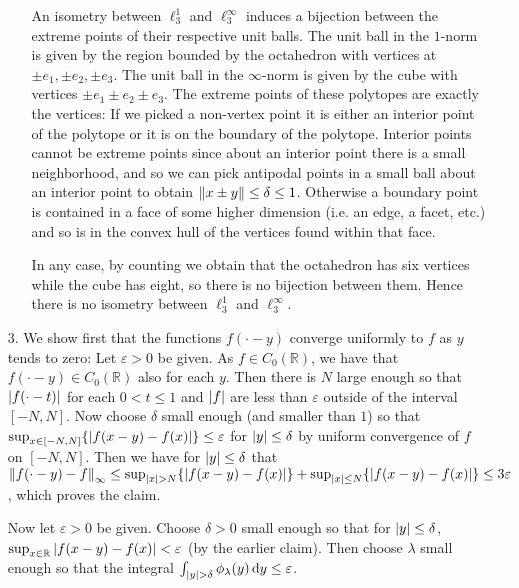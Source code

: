 \documentclass[11pt]{article}
\begin{document}
\begin{enumerate}
\begin{enumerate}
      An isometry between $\ell_3^1$ and $\ell_3^\infty$ induces a bijection between the extreme points of their respective unit balls. The unit ball in the $1$-norm is given by the region bounded by the octahedron with vertices at $\pm e_1, \pm e_2,\pm e_3$. The unit ball in the $\infty$-norm is given by the cube with vertices $\pm e_1\pm e_2\pm e_3$. The extreme points of these polytopes are exactly the vertices: If we picked a non-vertex point it is either an interior point of the polytope or it is on the boundary of the polytope. Interior points cannot be extreme points since about an interior point there is a small neighborhood, and so we can pick antipodal points in a small ball about an interior point to obtain $\norm{x\pm y}\leq \delta\leq 1$. Otherwise a boundary point is contained in a face of some higher dimension (i.e. an edge, a facet, etc.) and so is in the convex hull of the vertices found within that face. 

      In any case, by counting we obtain that the octahedron has six vertices while the cube has eight, so there is no bijection between them. Hence there is no isometry between $\ell_3^1$ and $\ell_3^\infty$.
    \end{enumerate}

    \item[3.] We show first that the functions $f(\cdot-y)$ converge uniformly to $f$ as $y$ tends to zero: Let $\varepsilon>0$ be given. As $f\in C_0(\mathbb{R})$, we have that $f(\cdot-y)\in C_0(\mathbb{R})$ also for each $y$. Then there is $N$ large enough so that $\abs{f(\cdot-t)}$ for each $0<t\leq 1$ and $\abs{f}$ are less than $\varepsilon$ outside of the interval $[-N,N]$. Now choose $\delta$ small enough (and smaller than $1$) so that $\sup_{x\in[-N,N]}\{\abs{f(x-y)-f(x)}\}\leq \varepsilon$ for $\abs{y}\leq \delta$ by uniform convergence of $f$ on $[-N,N]$. Then we have for $\abs{y}\leq \delta$ that $\norm{f(\cdot-y)-f}_\infty\leq \sup_{\abs{x}>N}\{\abs{f(x-y)-f(x)}\}+\sup_{\abs{x}\leq N}\{\abs{f(x-y)-f(x)}\}\leq 3\varepsilon$, which proves the claim.
    
    Now let $\varepsilon>0$ be given. Choose $\delta>0$ small enough so that for $\abs{y}\leq \delta$, $\sup_{x\in \mathbb{R}}\abs{f(x-y)-f(x)}<\varepsilon$ (by the earlier claim). Then choose $\lambda$ small enough so that the integral $\int_{\abs{y}>\delta}\phi_\lambda(y)\dd{y} \leq \varepsilon$. 


\end{enumerate}
\end{document}
